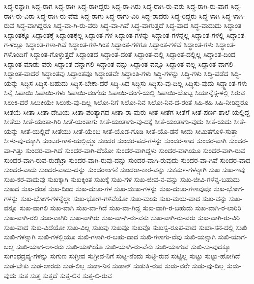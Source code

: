 {ಸಿದ್ಧ-ರನ್ನಾಗಿ
ಸಿದ್ಧ-ರಾಗ
ಸಿದ್ಧ-ರಾಗಿ
ಸಿದ್ಧ-ರಾಗಿದ್ದರು
ಸಿದ್ಧ-ರಾ-ಗಿರು
ಸಿದ್ಧ-ರಾಗಿ-ರು-ವರು
ಸಿದ್ಧ-ರಾಗಿ-ರು-ವಾಗ
ಸಿದ್ಧ-ರಾಗಿ-ರು-ವಿರಾ
ಸಿದ್ಧ-ರಾಗಿ-ರು-ವೆವು
ಸಿದ್ಧ-ರಾಗು
ಸಿದ್ಧ-ರಾಗು-ವಿರಿ
ಸಿದ್ಧ-ರಾದರು
ಸಿದ್ಧ-ರಿದ್ದರು
ಸಿದ್ಧ-ಳಾಗಿ
ಸಿದ್ಧ-ಳಾಗಿ-ರುವ
ಸಿದ್ಧ-ವಾಗಿದ್ದರೂ
ಸಿದ್ಧ-ವಾ-ಗಿ-ರು-ವರು
ಸಿದ್ಧ-ವಾ-ಗಿವೆ
ಸಿದ್ಧ-ವಾಗುತ್ತದೆ
ಸಿದ್ಧ-ವಾದ
ಸಿದ್ಧ-ವಾದುದು
ಸಿದ್ಧಾಂತ
ಸಿದ್ಧಾಂತಕ್ಕೂ
ಸಿದ್ಧಾಂತಕ್ಕೆ
ಸಿದ್ಧಾಂತಕ್ಕೆಲ್ಲ
ಸಿದ್ಧಾಂತ-ಗಳ
ಸಿದ್ಧಾಂತ-ಗಳನ್ನು
ಸಿದ್ಧಾಂತ-ಗಳನ್ನೆಲ್ಲ
ಸಿದ್ಧಾಂತ-ಗಳಲ್ಲಿ
ಸಿದ್ಧಾಂತ-ಗ-ಳಲ್ಲೂ
ಸಿದ್ಧಾಂತ-ಗಳಾ-ಗಿವೆ
ಸಿದ್ಧಾಂತ-ಗಳಿ-ಗಿಂತ
ಸಿದ್ಧಾಂತ-ಗಳಿಗೂ
ಸಿದ್ಧಾಂತ-ಗಳಿವೆ
ಸಿದ್ಧಾಂತ-ಗಳು
ಸಿದ್ಧಾಂತ-ಗಳೊಂದಿಗೆ
ಸಿದ್ಧಾಂತ-ಗೊಳ್ಳುತ್ತದೆ
ಸಿದ್ಧಾಂತದ
ಸಿದ್ಧಾಂತ-ದಂತೆ
ಸಿದ್ಧಾಂತ-ದಲ್ಲಿ
ಸಿದ್ಧಾಂತ-ದಲ್ಲಿಲ್ಲ
ಸಿದ್ಧಾಂತ-ದಿಂದ
ಸಿದ್ಧಾಂತ-ಮಾಡು-ವರು
ಸಿದ್ಧಾಂತ-ವನ್ನಾಗಲಿ
ಸಿದ್ಧಾಂತ-ವನ್ನು
ಸಿದ್ಧಾಂತ-ವನ್ನೂ
ಸಿದ್ಧಾಂತ-ವಲ್ಲ
ಸಿದ್ಧಾಂತ-ವಾಗಲಿ
ಸಿದ್ಧಾಂತ-ವಾದರೆ
ಸಿದ್ಧಾಂತವು
ಸಿದ್ಧಾಂತವೂ
ಸಿದ್ಧಾಂತವೇ
ಸಿದ್ಧಾಂತಿ-ಗಳು
ಸಿದ್ಧಿ-ಗಳನ್ನು
ಸಿದ್ಧಿ-ಗಳು
ಸಿದ್ಧಿ-ಪಡೆದ
ಸಿದ್ಧಿ-ಯನ್ನು
ಸಿದ್ಧಿಸ
ಸಿದ್ಧಿಸ-ಬಹುದು
ಸಿದ್ಧಿಸ-ಬೇಕಾ-ದರೆ
ಸಿದ್ಧಿ-ಸಿದ
ಸಿದ್ಧಿಸು
ಸಿದ್ಧಿಸು-ವು-ದಿಲ್ಲ
ಸಿದ್ಧಿಸು-ವುದು
ಸಿದ್ಧ್ದಾಂತ-ಗಳು
ಸಿನೈ
ಸಿಪಾಯಿ
ಸಿಪಾಯಿ-ಗಳು
ಸಿಪಾಯಿ-ದಂಗೆಯ
ಸಿಪಾಯಿ-ದಂಗೆ-ಯಲ್ಲಿ
ಸಿಪಾಯಿ-ಯೊಬ್ಬ
ಸಿಯಾನ್ನೆಸ್ಗ-ಳಲ್ಲಿ
ಸಿರುವ
ಸಿಲುಕಿ-ದರೆ
ಸಿಲುಕಿಯೇ
ಸಿಲುಕು-ವು-ದಿಲ್ಲ
ಸಿಲೋ-ನಿಗೆ
ಸಿಲೋ-ನಿನ
ಸಿಲೋ-ನಿನ-ದ-ರಂತೆ
ಸಿಹಿ-ಕಹಿ
ಸಿಹಿ-ನೀರಿದ್ದರೂ
ಸೀತಯೆ
ಸೀತಾ
ಸೀತಾ-ದೇವಿಯ
ಸೀತಾ-ಪರಿತ್ಯಾಗದ
ಸೀತಾ-ರಾ-ಮರು
ಸೀತೆ
ಸೀತೆಗ
ಸೀತೆಗೆ
ಸೀತೆ-ಪರ್ಣ-ಶಾಲೆ-ಯಲ್ಲಿದ್ದ
ಸೀತೆಯ
ಸೀತೆ-ಯಂತಾ-ಗಿರಿ
ಸೀತೆ-ಯಂತಾಗು
ಸೀತೆ-ಯಂತಾಗು-ವು-ದಕ್ಕೆ
ಸೀತೆ-ಯಂತಾಗು-ವುದು
ಸೀತೆ-ಯದು
ಸೀತೆ-ಯನ್ನು
ಸೀತೆ-ಯಲ್ಲಿದೆ
ಸೀತೆಯು
ಸೀತೆ-ಯೆಂಬ
ಸೀತೆ-ಯೊಡ-ಗೂಡಿ
ಸೀತೆ-ಯೊ-ಡನೆ
ಸೀದು
ಸೀಮಿತಗೊಳಿ-ಸುತ್ತಾ
ಸೀಳು-ವು-ದಕ್ಕಾಗಿ
ಸುಂಟರ-ಗಾಳಿ-ಯಲ್ಲಿದ್ದೂ
ಸುಂದರ
ಸುಂದರ-ಪದ-ಗಳನ್ನು
ಸುಂದರ-ಳಾದ
ಸುಂದರ-ವಾಗಿ
ಸುಂದರ-ವಾ-ಗಿತ್ತು
ಸುಂದರ-ವಾ-ಗಿದೆ
ಸುಂದರ-ವಾಗಿ-ದೆಯೋ
ಸುಂದರ-ವಾಗಿದ್ದಳು
ಸುಂದರ-ವಾಗಿಯೂ
ಸುಂದರ-ವಾಗಿ-ರುವ
ಸುಂದರ-ವಾಗಿ-ರುವ-ರುಡೆಟ್ರಾ
ಸುಂದರ-ವಾಗಿ-ರುವು-ದನ್ನು
ಸುಂದರ-ವಾಗಿ-ರುವುದು
ಸುಂದರ-ವಾ-ಗಿವೆ
ಸುಂದರ-ವಾದ
ಸುಂದರ-ವಾದು
ಸುಂದರ-ವಾದು-ದನ್ನು
ಸುಂದರಾಂಗನೆ
ಸುಂದರಾ-ಕಾರ-ವನ್ನು
ಸುಕರ್ಮ-ಗಳನ್ನಾಗಿ
ಸುಖ
ಸುಖ-ಇವು
ಸುಖ-ಕರ-ವಾದುವು
ಸುಖಕ್ಕಾಗಿ
ಸುಖಕ್ಕಿಂತ
ಸುಖಕ್ಕೆ
ಸುಖ-ಗಳ
ಸುಖ-ಜೀವ-ನ-ವನ್ನು
ಸುಖ-ಜೀವಿ-ಗಳೆನ್ನ-ಬಹುದು
ಸುಖದ
ಸುಖ-ದಂತೆ
ಸುಖ-ದಿಂದ
ಸುಖ-ದುಃಖ-ಗಳ
ಸುಖ-ದುಃಖ-ಗಳನ್ನು
ಸುಖ-ದುಃಖ-ಗಳಾವುವೂ
ಸುಖ-ಭೋಗ-ಗಳನ್ನು
ಸುಖ-ಭೋಗ-ಗಳನ್ನೆಲ್ಲಾ
ಸುಖ-ಭೋಗ-ಗಳಿವೆಯೋ
ಸುಖ-ಮಯ
ಸುಖ-ಮಯ-ವಾದ
ಸುಖ-ವನ್ನು
ಸುಖ-ವನ್ನೂ
ಸುಖ-ವಾಗಲಿ
ಸುಖ-ವಾಗಿ
ಸುಖ-ವಾ-ಗಿದೆ
ಸುಖ-ವಾ-ಗಿದ್ದ
ಸುಖ-ವಾಗಿ-ರ-ಬಹುದು
ಸುಖ-ವಾಗಿ-ರ-ಲಾರಿರಿ
ಸುಖ-ವಾಗಿ-ರಲಿ
ಸುಖ-ವಾಗಿರಿ
ಸುಖ-ವಾಗಿರು
ಸುಖ-ವಾ-ಗಿ-ರು-ವನು
ಸುಖ-ವಾಗಿ-ರು-ವರು
ಸುಖ-ವಾಗಿ-ರು-ವಿರಿ
ಸುಖ-ವಾದ
ಸುಖ-ವಿದೆಯೋ
ಸುಖ-ವಿಲ್ಲ
ಸುಖವು
ಸುಖವೂ
ಸುಖವೊ
ಸುಖಸ್ವ-ರೂಪ-ವಾದ
ಸುಖಾ-ಸನ-ದಲ್ಲಿ
ಸುಖಿ
ಸುಖಿ-ಗಳನ್ನಾಗಿ
ಸುಖಿ-ಗಳಲ್ಲಿಯೂ
ಸುಖಿ-ಗಳಾಗಿ-ರ-ಬಹು-ದಾದ
ಸುಖಿ-ಗಳಾಗು-ವೆವು
ಸುಖಿ-ಯನ್ನಾಗಿ
ಸುಖಿ-ಯಾಗ-ಬಲ್ಲ
ಸುಖಿ-ಯಾಗ-ಲಾ-ರರು
ಸುಖಿ-ಯಾಗಿಯೊ
ಸುಖಿ-ಯಾಗಿ-ರು-ವೆನು
ಸುಖಿ-ಯಾಗುವ
ಸುಖಿ-ಸು-ವುದಕ್ಕೂ
ಸುಗಂಧದ್ರವ್ಯ-ಗಳನ್ನು
ಸುಗುಣ
ಸುಗ್ರೀವ
ಸುಗ್ರೀವ-ನಿಗೆ
ಸುಟ್ಟ-ನೆಂದು
ಸುಟ್ಟಿ-ರುವ
ಸುಟ್ಟಿಲ್ಲ
ಸುಟ್ಟು
ಸುಟ್ಟು-ಹೋಗಿದೆ
ಸುಡ-ಬೇಕು
ಸುಡ-ಲಾರದು
ಸುಡ-ಲಿಲ್ಲ
ಸುಡಾ-ನಿನ
ಸುಡಾನ್
ಸುಡುತ್ತಿ-ರುವ
ಸುಡು-ವರೇ
ಸುಡು-ವು-ದಿಲ್ಲ
ಸುಡು-ವುದು
ಸುತ
ಸುತ್ತ
ಸುತ್ತದೆ
ಸುತ್ತ-ಲಿನ
ಸುತ್ತ-ಲಿ-ರುವ
}
